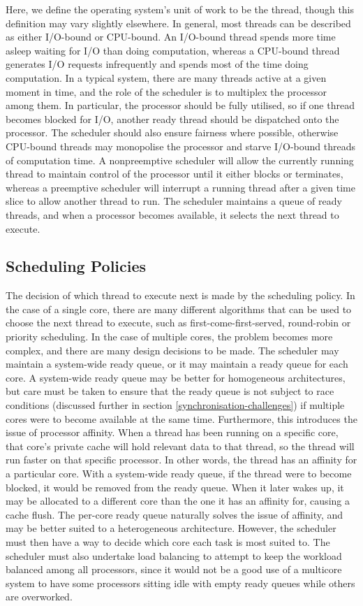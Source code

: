 \documentclass[bsc,frontabs,singlespacing,parskip,deptreport]{infthesis}
\begin{document}
Here, we define the operating system's unit of work to be the thread, though this definition may vary slightly elsewhere. In general, most threads can be described as either I/O-bound or CPU-bound. An I/O-bound thread spends more time asleep waiting for I/O than doing computation, whereas a CPU-bound thread generates I/O requests infrequently and spends most of the time doing computation. In a typical system, there are many threads active at a given moment in time, and the role of the scheduler is to multiplex the processor among them. In particular, the processor should be fully utilised, so if one thread becomes blocked for I/O, another ready thread should be dispatched onto the processor. The scheduler should also ensure fairness where possible, otherwise CPU-bound threads may monopolise the processor and starve I/O-bound threads of computation time. A nonpreemptive scheduler will allow the currently running thread to maintain control of the processor until it either blocks or terminates, whereas a preemptive scheduler will interrupt a running thread after a given time slice to allow another thread to run. The scheduler maintains a queue of ready threads, and when a processor becomes available, it selects the next thread to execute.

\subsection{Scheduling Policies}
\label{scheduling-challenges}
The decision of which thread to execute next is made by the scheduling policy. In the case of a single core, there are many different algorithms that can be used to choose the next thread to execute, such as first-come-first-served, round-robin or priority scheduling. In the case of multiple cores, the problem becomes more complex, and there are many design decisions to be made. The scheduler may maintain a system-wide ready queue, or it may maintain a ready queue for each core. A system-wide ready queue may be better for homogeneous architectures, but care must be taken to ensure that the ready queue is not subject to race conditions (discussed further in section \ref{synchronisation-challenges}) if multiple cores were to become available at the same time. Furthermore, this introduces the issue of processor affinity. When a thread has been running on a specific core, that core’s private cache will hold relevant data to that thread, so the thread will run faster on that specific processor. In other words, the thread has an affinity for a particular core. With a system-wide ready queue, if the thread were to become blocked, it would be removed from the ready queue. When it later wakes up, it may be allocated to a different core than the one it has an affinity for, causing a cache flush. The per-core ready queue naturally solves the issue of affinity, and may be better suited to a heterogeneous architecture. However, the scheduler must then have a way to decide which core each task is most suited to. The scheduler must also undertake load balancing to attempt to keep the workload balanced among all processors, since it would not be a good use of a multicore system to have some processors sitting idle with empty ready queues while others are overworked. 
\end{document}
